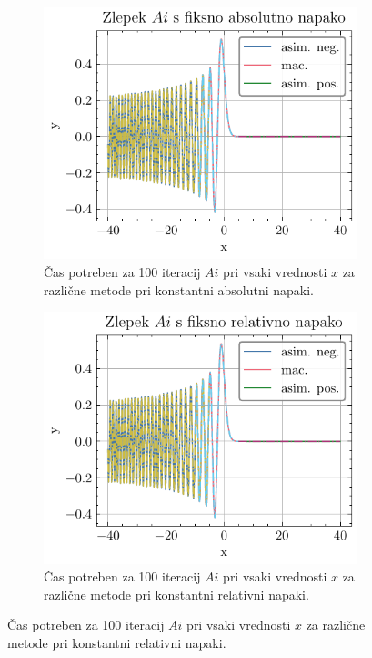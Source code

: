 \documentclass[slovene,11pt,a4paper]{article}
\begin{document}
\begin{figure}[H]
  \begin{subfigure}{0.43\textwidth}
    \centering
    \includegraphics[width=\linewidth]{graphs/zlepek_ai_abs.pdf}
    \caption{Čas potreben za 100 iteracij $Ai$ pri vsaki vrednosti $x$ za različne metode pri konstantni absolutni napaki.}
  \end{subfigure}\hfill
  \begin{subfigure}{0.43\textwidth}
    \centering
    \includegraphics[width=\linewidth]{graphs/zlepek_ai_rel.pdf}
    \caption{Čas potreben za 100 iteracij $Ai$ pri vsaki vrednosti $x$ za različne metode pri konstantni relativni napaki.}
  \end{subfigure}
\end{figure}
\end{document}
